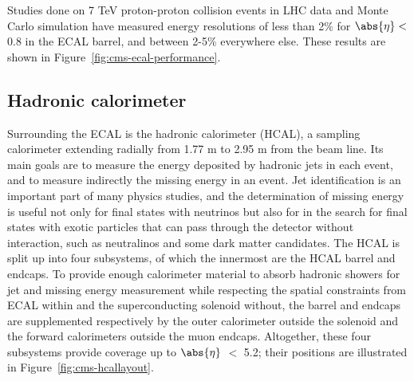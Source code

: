 Studies done on 7 TeV proton-proton collision events in LHC data and Monte Carlo simulation have measured energy resolutions of less than 2\% for $\abs{\eta} <$ 0.8 in the ECAL barrel, and between 2-5\% everywhere else. These results are shown in Figure~\ref{fig:cms-ecal-performance}.

\subsection{Hadronic calorimeter\label{sec:cms-hcal}}

Surrounding the ECAL is the hadronic calorimeter (HCAL), a sampling calorimeter extending radially from 1.77 m to 2.95 m from the beam line. Its main goals are to measure the energy deposited by hadronic jets in each event, and to measure indirectly the missing energy in an event. Jet identification is an important part of many physics studies, and the determination of missing energy is useful not only for final states with neutrinos but also for in the search for final states with exotic particles that can pass through the detector without interaction, such as neutralinos and some dark matter candidates. The HCAL is split up into four subsystems, of which the innermost are the HCAL barrel and endcaps. To provide enough calorimeter material to absorb hadronic showers for jet and missing energy measurement while respecting the spatial constraints from ECAL within and the superconducting solenoid without, the barrel and endcaps are supplemented respectively by the outer calorimeter outside the solenoid and the forward calorimeters outside the muon endcaps. Altogether, these four subsystems provide coverage up to $\abs{\eta}$ $<$ 5.2; their positions are illustrated in Figure~\ref{fig:cms-hcallayout}.

